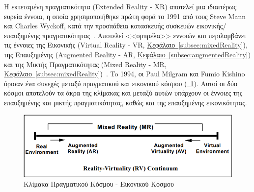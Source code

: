 
 Η εκτεταμένη πραγματικότητα (Extended Reality - XR) αποτελεί μια ιδιαιτέρως ευρεία έννοια, η οποία χρησιμοποιήθηκε πρώτη φορά το 1991 από τους Steve Mann και Charles Wyckoff, κατά την προσπάθεια κατασκευής συσκευών εικονικής/επαυξημένης πραγματικότητας~\cite{mann_2023_fundamentals}\cite{mann_1991_extended}. Αποτελεί <<ομπρέλα>> εννοιών και περιλαμβάνει τις έννοιες της Εικονικής (Virtual Reality - VR, \hyperref[subsec:mixedReality]{Κεφάλαιο~\ref*{subsec:mixedReality}}), της Επαυξημένης (Augmented Reality - AR, \hyperref[subsec:augmentedReality]{Κεφάλαιο~\ref*{subsec:augmentedReality}}) και της Μικτής Πραγματικότητας (Mixed Reality - MR, \hyperref[subsec:mixedReality]{Κεφάλαιο~\ref*{subsec:mixedReality}})~\cite{milgram_1994_augmented}. To 1994, οι Paul Milgram και Fumio Kishino όρισαν ένα συνεχές μεταξύ πραγματικού και εικονικού κόσμου (\hyperref[fig:rv_continuum]{\schema~\ref*{fig:rv_continuum}}). Αυτοί οι δύο κόσμοι αποτελούν τα άκρα της κλίμακας και μεταξύ αυτών υπάρχουν οι έννοιες της επαυξημένης και μικτής πραγματικότητας, καθώς και της επαυξημένης εικονικότητας.
\begin{figure}[!h]
    \centering
    \includegraphics[width=120mm]{images/rv_continuum.png}
    \caption[Κλίμακα Πραγματικού Κόσμου - Εικονικού Κόσμου]{Κλίμακα Πραγματικού Κόσμου - Εικονικού Κόσμου~\cite{milgram_1994_augmented}}\label{fig:rv_continuum}
\end{figure}

